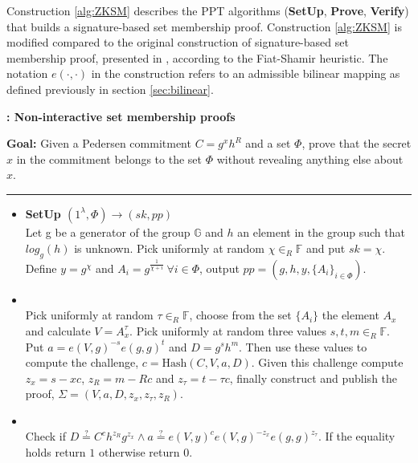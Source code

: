 Construction \ref{alg:ZKSM} describes the  PPT algorithms (\textbf{SetUp}, \textbf{Prove}, \textbf{Verify}) that builds a signature-based set membership proof. Construction \ref{alg:ZKSM} is modified compared to the original construction of signature-based set membership proof, presented in \cite{RANGE-SET}, according to the Fiat-Shamir heuristic. The notation $e(\cdot,\cdot)$ in the construction refers to an admissible bilinear mapping as defined previously in section \ref{sec:bilinear}.
\begin{algorithm}[]
\caption{\textbf{: Non-interactive set membership proofs}}
\textbf{Goal:} Given a Pedersen commitment $C=g^x h^R$ and a set $\Phi$, prove that the secret $x$ in the commitment belongs to the set $\Phi$ without revealing anything else about $x$.
\vspace{1pt}\hrule\vspace{2pt}
\begin{itemize}
  \item\textbf{SetUp $(1^{\lambda}, \Phi)\xrightarrow[]{}(sk,pp)$}\\
 Let g be a generator of the group $\mathds{G}$ and $h$ an element in the group such that $log_g(h)$ is unknown.  
Pick uniformly at random $\chi\in_R\mathds{F}$ and put $sk=\chi$. Define $y=g^\chi$ and $A_i=g^{\frac{1}{\chi+i}} \:\forall i\in\Phi$, output $pp=(g,h,y,\{A_i\}_{i\in\Phi})$.

\item{}\\
Pick uniformly at random $\tau\in_R\mathds{F}$, choose from the set $\{A_i\}$ the element $A_x$ and calculate $V=A_x^\tau$. Pick uniformly at random three values $s,t,m\in_R\mathds{F}$. Put $a=e(V,g)^{-s}e(g,g)^t$ and $D=g^sh^m$. Then use these values to compute the challenge, $c=\text{Hash}(C,V,a,D)$. Given this challenge compute $z_x = s-x c$, $z_R = m-Rc$ and $z_\tau= t-\tau c$, finally construct and publish the proof, $\Sigma = (V,a,D,z_x,z_\tau,z_R)$.

\item{}\\
Check if $D\overset{?}{=}C^ch^{z_R}g^{z_x}\wedge a \overset{?}{=} e(V,y)^c e(V,g)^{-z_x}e(g,g)^{z_\tau}$. If the equality holds return $1$ otherwise return $0$.
\end{itemize}
\label{alg:ZKSM}
\end{algorithm}

